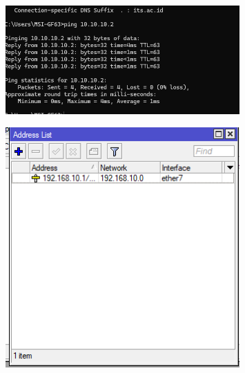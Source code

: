\begin{figure}[H]
    \centering
    \includegraphics[width=0.8\textwidth]{P1/img/5.png}
\end{figure}
\begin{figure}[H]
    \centering
    \includegraphics[width=0.8\textwidth]{P1/img/6.png}
\end{figure}